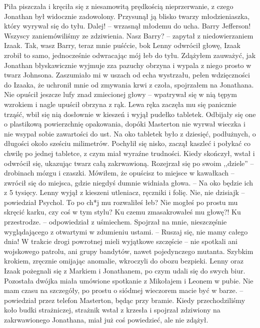 \documentclass[../MAIN.tex]{subfiles}
\begin{document}
Piła piszczała i kręciła się z niesamowitą prędkością nieprzerwanie, z czego Jonathan był widocznie zadowolony. Przysunął ją blisko twarzy młodzieniaszka, który wyrywał się do tyłu.
\sx Dalej! -- wrzasnął młodemu do ucha.
\xx Barry Jefferson!
\qd
Wszyscy zaniemówiliśmy ze zdziwienia.
\sx Nasz Barry? -- zapytał z niedowierzaniem Izaak.
\xx Tak, wasz Barry, teraz mnie puśćcie, bo\3k
\qd
Lenny odwrócił głowę, Izaak zrobił to samo, jednocześnie odwracając mój łeb do tyłu.
Zdążyłem zauważyć, jak Jonathan błyskawicznie wyjmuje zza pazuchy obrzyna i wypala z niego prosto w twarz Johnsona. Zaszumiało mi w uszach od echa wystrzału, pełen wdzięczności do Izaaka, że uchronił mnie od zmywania krwi z czoła, spojrzałem na Jonathana. \\
Nie opuścił jeszcze lufy znad zmiecionej głowy -- wpatrywał się w nią tępym wzrokiem i nagle upuścił obrzyna z rąk. Lewa ręka zaczęła mu się panicznie trząść, wbił się nią dosłownie w kieszeń i wyjął pudełko tabletek. Odbijały się one o plastikową powierzchnię opakowania, dopóki Masterton nie wyrwał wieczka i nie wsypał sobie zawartości do ust. Na oko tabletek było z dziesięć, podłużnych, o długości około sześciu milimetrów. Pochylił się nisko, zaczął kaszleć i połykać co chwilę po jednej tabletce, z czym miał wyraźne trudności. Kiedy skończył, wstał i odwrócił się, ukazując twarz całą zakrwawioną. Rozejrzał się po swoim ,,dziele'' -- drobinach mózgu i czaszki.
\sx Mówiłem, że opuścisz to miejsce w kawałkach -- zwrócił się do miejsca, gdzie niegdyś dumnie widniała głowa. -- Na oko będzie ich z 5 tysięcy.
\qd
Lenny wyjął z kieszeni utleniacz, ręczniki i folię.
\sx Nie, nie dzisiaj\3k -- powiedział Psychol.
\xx To po ch*j mu rozwaliłeś łeb? Nie mogłeś po prostu mu skręcić karku, czy coś w tym stylu? Ku czemu zmasakrowałeś mu głowę?!
\xx Ku przestrodze. -- odpowiedział z uśmiechem. Spojrzał na mnie, nieszczęśnie wyglądającego z otwartymi w zdumieniu ustami. -- Ruszaj się, nie mamy całego dnia!
\qd
W trakcie drogi powrotnej mieli wyjątkowe szczęście -- nie spotkali ani wojskowego patrolu, ani grupy bandytów, nawet pojedynczego mutanta. Szybkim krokiem, zręcznie omijając anomalie, wkroczyli do obozu bezpieki. Lenny oraz Izaak pożegnali się z Markiem i Jonathanem, po czym udali się do swych biur. Pozostała dwójka miała umówione spotkanie z Mikołajem i Leonem w pubie.
%
\sx Nie mam czasu na szczegóły, po prostu o siódmej wieczorem macie być w barze. -- powiedział przez telefon Masterton, będąc przy bramie.
\qd
Kiedy przechodziliśmy koło budki strażniczej, strażnik wstał z krzesła i spojrzał zdziwiony na zakrwawionego Jonathana, miał już coś powiedzieć, ale nie zdążył.
\end{document}
